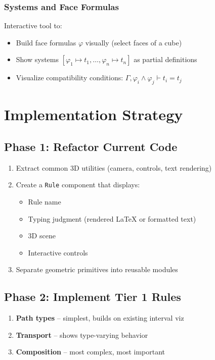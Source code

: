 \documentclass[11pt,a4paper]{article}
\begin{document}
\subsubsection{Systems and Face Formulas}

Interactive tool to:
\begin{itemize}
\item Build face formulas $\varphi$ visually (select faces of a cube)
\item Show systems $[\varphi_1 \mapsto t_1, \ldots, \varphi_n \mapsto t_n]$ as partial definitions
\item Visualize compatibility conditions: $\Gamma, \varphi_i \wedge \varphi_j \vdash t_i = t_j$
\end{itemize}

\section{Implementation Strategy}

\subsection{Phase 1: Refactor Current Code}
\begin{enumerate}
\item Extract common 3D utilities (camera, controls, text rendering)
\item Create a \texttt{Rule} component that displays:
  \begin{itemize}
  \item Rule name
  \item Typing judgment (rendered LaTeX or formatted text)
  \item 3D scene
  \item Interactive controls
  \end{itemize}
\item Separate geometric primitives into reusable modules
\end{enumerate}

\subsection{Phase 2: Implement Tier 1 Rules}
\begin{enumerate}
\item \textbf{Path types} -- simplest, builds on existing interval viz
\item \textbf{Transport} -- shows type-varying behavior
\item \textbf{Composition} -- most complex, most important
\end{enumerate}
\end{document}
